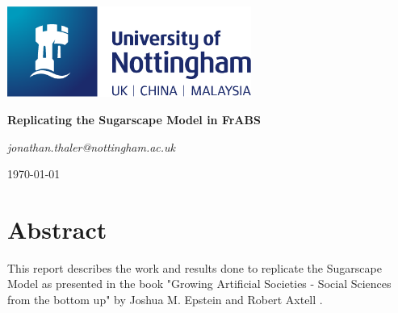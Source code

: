 \documentclass[oneside]{book}
\begin{document}
\begin{titlepage}
	\centering
	\includegraphics[width=0.60\textwidth]{../../logo/UoN_Primary_Logo_RGB.png}\par\vspace{1cm}
	\vspace{1.5cm}
	{\huge\bfseries Replicating the Sugarscape Model in FrABS \par}
	\vspace{2cm}
	{\Large\itshape jonathan.thaler@nottingham.ac.uk \par}
	\vfill
	
	\vfill

	{\large \today\par}
\end{titlepage}

\cleardoublepage

\section*{Abstract}
This report describes the work and results done to replicate the Sugarscape Model as presented in the book "Growing Artificial Societies - Social Sciences from the bottom up" by Joshua M. Epstein and Robert Axtell \cite{epstein_growing_1996}.

\clearpage
\tableofcontents
\clearpage







%

%

\renewcommand\bibname{References}



\end{document}

